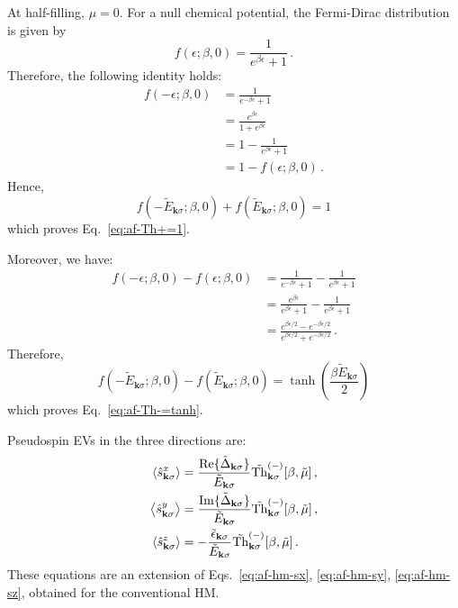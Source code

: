 \begin{tabproof}[Proof of Eqs.~\eqref{eq:af-Th+=1}, \eqref{eq:af-Th-=tanh}]
	
	At half-filling, $\mu=0$. For a null chemical potential, the Fermi-Dirac distribution is given by
	\[
	f(\epsilon;\beta,0) = \frac{1}{e^{\beta\epsilon}+1} \, .
	\]
	Therefore, the following identity holds:
	\[
	\begin{aligned}
		f(-\epsilon;\beta,0) &= \frac{1}{e^{-\beta\epsilon}+1} \\
		&= \frac{e^{\beta\epsilon}}{1+e^{\beta\epsilon}} \\
		&= 1 - \frac{1}{e^{\beta\epsilon}+1} \\
		&= 1-f(\epsilon;\beta,0) \, .
	\end{aligned}
	\]
	Hence,
	\[
	f(-\tilde{E}_{\mathbf{k}\sigma};\beta,0) + f(\tilde{E}_{\mathbf{k}\sigma};\beta,0) = 1
	\]
	which proves Eq.~\eqref{eq:af-Th+=1}.
	
	Moreover, we have:
	\[
	\begin{aligned}
		f(-\epsilon;\beta,0) - f(\epsilon;\beta,0) &= \frac{1}{e^{-\beta\epsilon}+1} - \frac{1}{e^{\beta\epsilon}+1} \\
		&= \frac{e^{\beta\epsilon}}{e^{\beta\epsilon}+1} - \frac{1}{e^{\beta\epsilon}+1} \\
		&= \frac{e^{\beta\epsilon/2}-e^{-\beta\epsilon/2}}{e^{\beta\epsilon/2}+e^{-\beta\epsilon/2}} \, .
	\end{aligned}
	\]
	Therefore,
	\[
	f(-\tilde{E}_{\mathbf{k}\sigma};\beta,0) - f(\tilde{E}_{\mathbf{k}\sigma};\beta,0) = \tanh(\frac{\beta \tilde{E}_{\mathbf{k}\sigma}}{2})
	\]
	which proves Eq.~\eqref{eq:af-Th-=tanh}.
\end{tabproof}

Pseudospin EVs in the three directions are:
\begin{align}
	\ev{\hat s_{\mathbf{k}\sigma}^x} &= \frac{\Re \lbrace \tilde{\Delta}_{\mathbf{k}\sigma} \rbrace}{\tilde{E}_{\mathbf{k}\sigma}} \tilde{\mathrm{Th}}_{\mathbf{k}\sigma}^{(-)}[\beta,\tilde{\mu}] \, , \label{eq:af-ehm-sx} \\
	\ev{\hat s_{\mathbf{k}\sigma}^y} &= \frac{\Im \lbrace \tilde{\Delta}_{\mathbf{k}\sigma} \rbrace}{\tilde{E}_{\mathbf{k}\sigma}} \tilde{\mathrm{Th}}_{\mathbf{k}\sigma}^{(-)}[\beta,\tilde{\mu}] \, , \label{eq:af-ehm-sy} \\
	\ev{\hat s_{\mathbf{k}\sigma}^z} &=  -\frac{\tilde{\epsilon}_{\mathbf{k}\sigma}}{\tilde{E}_{\mathbf{k}\sigma}}  \tilde{\mathrm{Th}}_{\mathbf{k}\sigma}^{(-)}[\beta,\tilde{\mu}] \, . \label{eq:af-ehm-sz}
\end{align}
These equations are an extension of Eqs.~\eqref{eq:af-hm-sx}, \eqref{eq:af-hm-sy}, \eqref{eq:af-hm-sz}, obtained for the conventional HM.

